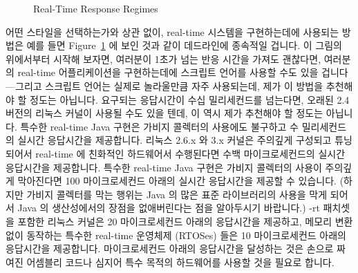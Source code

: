 \begin{figure}[tb]
\centering
{}
\caption{Real-Time Response Regimes}
\label{fig:advsync:Real-Time Response Regimes}
\end{figure}

어떤 스타일을 선택하는가와 상관 없이, real-time 시스템을 구현하는데에 사용되는
방법은 예를 들면
Figure~\ref{fig:advsync:Real-Time Response Regimes} 에 보인 것과 같이 데드라인에
종속적일 겁니다.
이 그림의 위에서부터 시작해 보자면, 여러분이 1초가 넘는 반응 시간을 가져도
괜찮다면, 여러분의 real-time 어플리케이션을 구현하는데에 스크립트 언어를 사용할
수도 있을 겁니다---그리고 스크립트 언어는 실제로 놀라울만큼 자주 사용되는데,
제가 이 방법을 추천해야 할 정도는 아닙니다.
요구되는 응답시간이 수십 밀리세컨드를 넘는다면, 오래된 2.4 버전의 리눅스 커널이
사용될 수도 있을 텐데, 이 역시 제가 추천해야 할 정도는 아닙니다.
특수한 real-time Java 구현은 가비지 콜렉터의 사용에도 불구하고 수 밀리세컨드의
실시간 응답시간을 제공합니다.
리눅스 2.6.x 와 3.x 커널은 주의깊게 구성되고 튜닝되어서 real-time 에 친화적인
하드웨어서 수행된다면 수백 마이크로세컨드의 실시간 응답시간을 제공합니다.
특수한 real-time Java 구현은 가비지 콜렉터의 사용이 주의깊게 막아진다면 100
마이크로세컨드 아래의 실시간 응답시간을 제공할 수 있습니다.
(하지만 가비지 콜렉터를 막는 행위는 Java 의 많은 표준 라이브러리의 사용을 막게
되어서 Java 의 생산성에서의 장점을 없애버린다는 점을 알아두시기 바랍니다.)
-rt 패치셋을 포함한 리눅스 커널은 20 마이크로세컨드 아래의 응답시간을 제공하고,
메모리 변환 없이 동작하는 특수한 real-time 운영체제 (RTOSes) 들은 10
마이크로세컨드 아래의 응답시간을 제공합니다.
마이크로세컨드 아래의 응답시간을 달성하는 것은 손으로 짜여진 어셈블리 코드나
심지어 특수 목적의 하드웨어를 사용할 것을 필요로 합니다.
\iffalse

